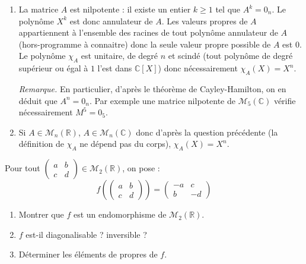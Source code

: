 \documentclass[a4paper,10pt]{report}
\begin{document}
\begin{enumerate}
\item La matrice $A$ est nilpotente : il existe un entier $k \geq 1$ tel que $A^k = 0_n$. Le polynôme $X^k$ est donc annulateur de $A$. Les valeurs propres de $A$ appartiennent à l'ensemble des racines de tout polynôme annulateur de $A$ (hors-programme à connaitre) donc la seule valeur propre possible de $A$ est $0$. Le polynôme $\chi_A$ est unitaire, de degré $n$ et scindé (tout polynôme de degré supérieur ou égal à $1$ l'est dans $\mathbb{C}[X]$) donc nécessairement $\chi_A(X)=X^n$.

\medskip

\noindent \textit{Remarque.} En particulier, d'après le théorème de Cayley-Hamilton, on en déduit que $A^n=0_n$. Par exemple une matrice nilpotente de $\mathcal{M}_5(\mathbb{C})$ vérifie nécessairement $M^5=0_5$.
\item Si $A \in \mathcal{M}_n(\mathbb{R})$, $A \in \mathcal{M}_n(\mathbb{C})$ donc d'après la question précédente (la définition de $\chi_A$ ne dépend pas du corps), $\chi_A(X)=X^n$.
\end{enumerate}

\begin{Exercice}{} Pour tout $\begin{pmatrix}
a & b \\
c & d 
\end{pmatrix} \in \mathcal{M}_2(\mathbb{R})$, on pose :
$$ f \left( \begin{pmatrix}
a & b \\
c & d 
\end{pmatrix} \right) = \begin{pmatrix}
-a & c \\
b & -d 
\end{pmatrix}$$

\begin{enumerate}
\item Montrer que $f$ est un endomorphisme de $\mathcal{M}_2(\mathbb{R})$.
\item $f$ est-il diagonalisable ? inversible ?
\item Déterminer les éléments de propres de $f$.
\end{enumerate}
\end{Exercice}

\corr 
\end{document}
